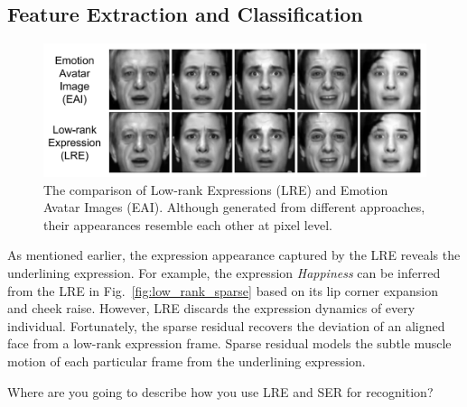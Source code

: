 \documentclass[journal]{IEEEtran}
\begin{document}
\subsection{Feature Extraction and Classification}



\begin{figure}[htbp]
	\centering
		\includegraphics[width=\columnwidth]{pics/eai_lre_compare.png}
	\caption{The comparison of Low-rank Expressions (LRE) and Emotion Avatar Images (EAI). Although generated from different approaches, their appearances resemble each other at pixel level.}
	\label{fig:eai_lre_compare}
\end{figure}

As mentioned earlier, the expression appearance captured by the LRE reveals the underlining expression. For example, the expression \textit{Happiness} can be inferred from the LRE in Fig.~\ref{fig:low_rank_sparse} based on its lip corner expansion and cheek raise. However, LRE discards the expression dynamics of every individual. Fortunately, the sparse residual recovers the deviation of an aligned face from a low-rank expression frame. Sparse residual models the subtle muscle motion of each particular frame from the underlining expression. 

\textcolor[rgb]{1,0,0}{Where are you going to describe how you use LRE and SER for recognition?} 
\end{document}
